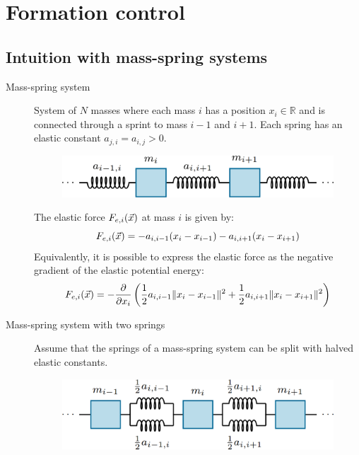 \chapter{Formation control}


\section{Intuition with mass-spring systems}

\begin{description}
    \item[Mass-spring system] 
        System of $N$ masses where each mass $i$ has a position $x_i \in \mathbb{R}$ and is connected through a sprint to mass $i-1$ and $i+1$. Each spring has an elastic constant $a_{j, i} = a_{i, j} > 0$.

        \begin{figure}[H]
            \centering
            \includegraphics[width=0.35\linewidth]{./img/mass_spring_system.png}
        \end{figure}

        The elastic force $F_{e,i}({\vec{x}})$ at mass $i$ is given by:
        \[
            F_{e,i}({\vec{x}}) = -a_{i,i-1}(x_i-x_{i-1}) - a_{i,i+1}(x_i - x_{i+1})
        \]
        Equivalently, it is possible to express the elastic force as the negative gradient of the elastic potential energy:
        \[
            F_{e,i}({\vec{x}}) = -\frac{\partial}{\partial x_i}\left( \frac{1}{2} a_{i,i-1} \Vert x_i - x_{i-1} \Vert^2 + \frac{1}{2} a_{i,i+1} \Vert x_i - x_{i+1} \Vert^2 \right)
        \]

    \item[Mass-spring system with two springs] 
        Assume that the springs of a mass-spring system can be split with halved elastic constants.
        \begin{figure}[H]
            \centering
            \includegraphics[width=0.35\linewidth]{./img/mass_spring_system2.png}
        \end{figure}


\end{description}
